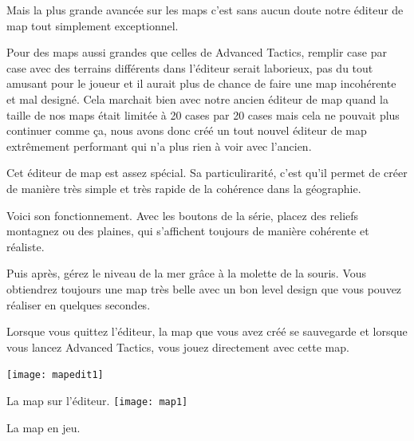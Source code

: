 \documentclass{article}
\begin{document}
\par
Mais la plus grande avancée sur les maps c'est sans aucun doute notre éditeur de map tout simplement exceptionnel.
\newline

\par
Pour des maps aussi grandes que celles de Advanced Tactics, remplir case par case avec des terrains différents dans l'éditeur serait laborieux, pas du tout amusant pour le joueur et il aurait plus de chance de faire une map incohérente et mal designé. Cela marchait bien avec notre ancien éditeur de map
quand la taille de nos maps était limitée à 20 cases par 20 cases mais cela ne pouvait plus continuer comme ça, nous avons donc créé un tout nouvel éditeur de map extrêmement performant qui n'a plus rien à voir avec l'ancien.
\newline

\par
Cet éditeur de map est assez spécial. Sa particulirarité, c'est qu'il permet de créer de manière très simple et très rapide de la cohérence dans la géographie.
\newline

\par
Voici son fonctionnement. Avec les boutons de la série, placez des reliefs montagnez ou des plaines, qui s'affichent toujours de manière cohérente et réaliste.
\newline

\par
Puis après, gérez le niveau de la mer grâce à la molette de la souris. Vous obtiendrez toujours une map très belle avec un bon level design que vous pouvez réaliser en quelques secondes.
\newline

\par
Lorsque vous quittez l'éditeur, la map que vous avez créé se sauvegarde et lorsque vous lancez Advanced Tactics, vous jouez directement avec cette map.
\newline

\newpage

\begin{center}
\texttt{[image: mapedit1]}
\newline
\par
La map sur l'éditeur.
\newline
\texttt{[image: map1]}
\newline
\par
La map en jeu.
\end{center}
\end{document}
